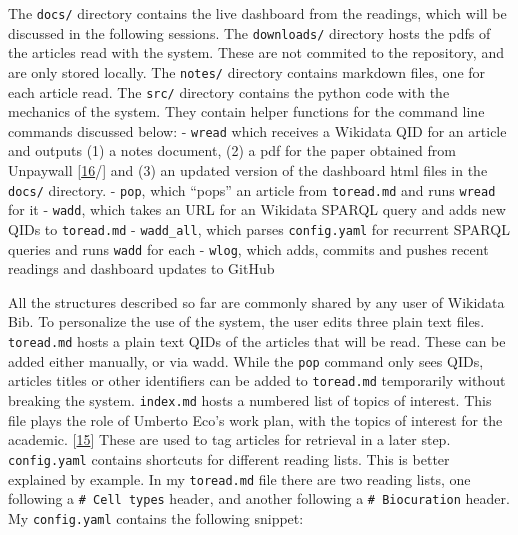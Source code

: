 The \texttt{docs/} directory contains the live dashboard from the readings, which will be discussed in the following sessions.
The \texttt{downloads/} directory hosts the pdfs of the articles read with the system.
These are not commited to the repository, and are only stored locally.
The \texttt{notes/} directory contains markdown files, one for each article read.
The \texttt{src/} directory contains the python code with the mechanics of the system.
They contain helper functions for the command line commands discussed below:
- \texttt{wread} which receives a Wikidata QID for an article and outputs (1) a notes document, (2) a pdf for the paper obtained from Unpaywall {[}\protect\hyperlink{ref-15luL9zZC}{16}/{]} and (3) an updated version of the dashboard html files in the \texttt{docs/} directory.
- \texttt{pop}, which ``pops'' an article from \texttt{toread.md} and runs \texttt{wread} for it
- \texttt{wadd}, which takes an URL for an Wikidata SPARQL query and adds new QIDs to \texttt{toread.md}
- \texttt{wadd\_all}, which parses \texttt{config.yaml} for recurrent SPARQL queries and runs \texttt{wadd} for each
- \texttt{wlog}, which adds, commits and pushes recent readings and dashboard updates to GitHub

All the structures described so far are commonly shared by any user of Wikidata Bib.
To personalize the use of the system, the user edits three plain text files.
\texttt{toread.md} hosts a plain text QIDs of the articles that will be read.
These can be added either manually, or via wadd.
While the \texttt{pop} command only sees QIDs, articles titles or other identifiers can be added to \texttt{toread.md} temporarily without breaking the system.
\texttt{index.md} hosts a numbered list of topics of interest.
This file plays the role of Umberto Eco's work plan, with the topics of interest for the academic. {[}\protect\hyperlink{ref-1HBVPtZGp}{15}{]}
These are used to tag articles for retrieval in a later step.
\texttt{config.yaml} contains shortcuts for different reading lists.
This is better explained by example.
In my \texttt{toread.md} file there are two reading lists, one following a \texttt{\#\ Cell\ types} header, and another following a \texttt{\#\ Biocuration} header.
My \texttt{config.yaml} contains the following snippet:

\begin{Shaded}
\begin{Highlighting}[]
\KeywordTok{:}
\AttributeTok{  }\KeywordTok{:}
\AttributeTok{  }\KeywordTok{:}
\end{Highlighting}
\end{Shaded}

